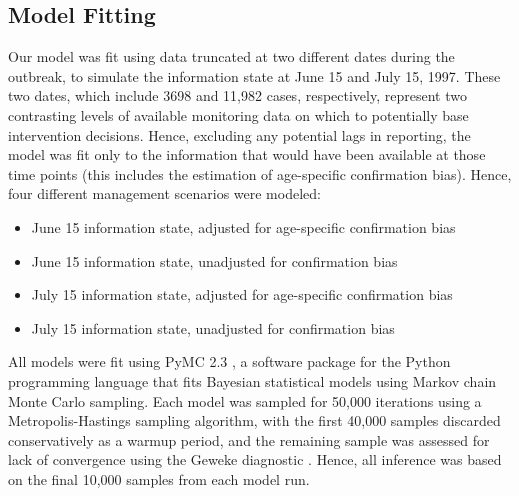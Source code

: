 \subsection{Model Fitting}\label{model-fitting}

Our model was fit using data truncated at two different dates during the outbreak, to simulate the information state at June 15 and July 15, 1997. These two dates, which include 3698 and 11,982 cases, respectively, represent two contrasting levels of available monitoring data on which to potentially base intervention decisions. Hence, excluding any potential lags in reporting, the model was fit only to the information that would have been available at those time points (this includes the estimation of age-specific confirmation bias). Hence, four different management scenarios were modeled:

\begin{itemize}
\item June 15 information state, adjusted for age-specific confirmation bias
\item June 15 information state, unadjusted for confirmation bias
\item July 15 information state, adjusted for age-specific confirmation bias
\item July 15 information state, unadjusted for confirmation bias
\end{itemize}

All models were fit using PyMC 2.3 \cite{Patil_2010}, a software package for the Python programming language that fits
Bayesian statistical models using Markov chain Monte Carlo \citep[MCMC]{Geyer_2011} sampling. Each model was sampled for 50,000 iterations using a Metropolis-Hastings sampling algorithm, with the first 40,000 samples discarded conservatively as a warmup period, and the remaining sample was assessed for lack of convergence using the Geweke diagnostic \cite{Geweke:1992tk}. Hence, all inference was based on the final 10,000 samples from each model run.